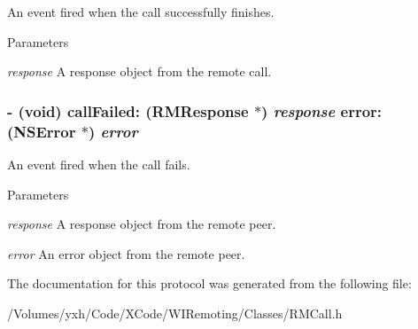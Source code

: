 An event fired when the call successfully finishes. 
\begin{DoxyParams}{Parameters}
\item[{\em response}]A response object from the remote call. \end{DoxyParams}
\hypertarget{protocol_r_m_call_delegate-p_a77f0f0f7675f43f3052198c74bfcdbe1}{
\subsubsection[{callFailed:error:}]{\setlength{\rightskip}{0pt plus 5cm}-\/ (void) callFailed: ({\bf RMResponse} $\ast$) {\em response}\/ error: (NSError $\ast$) {\em error}}}
\label{protocol_r_m_call_delegate-p_a77f0f0f7675f43f3052198c74bfcdbe1}


An event fired when the call fails. 
\begin{DoxyParams}{Parameters}
\item[{\em response}]A response object from the remote peer. \item[{\em error}]An error object from the remote peer. \end{DoxyParams}


The documentation for this protocol was generated from the following file:\begin{DoxyCompactItemize}
\item 
/Volumes/yxh/Code/XCode/WIRemoting/Classes/RMCall.h\end{DoxyCompactItemize}
